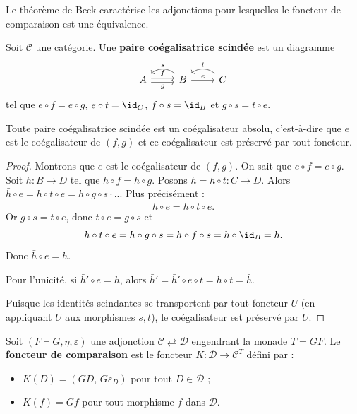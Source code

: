 Le théorème de Beck caractérise les adjonctions
pour lesquelles le foncteur de comparaison est une équivalence.

\begin{definition}\label{def:paire-coeg-scindee}
Soit $\mathcal{C}$ une catégorie.
Une \textbf{paire coégalisatrice scindée} est un diagramme
\[
\begin{tikzcd}
A \arrow[r, shift left=0.5ex, "f"] \arrow[r, shift right=0.5ex, "g"'] &
B \arrow[r, "e"] \arrow[l, bend right=40, "s"'] &
C \arrow[l, bend right=40, "t"']
\end{tikzcd}
\]
tel que $e \circ f = e \circ g$, $e \circ t = \id_C$,
$f \circ s = \id_B$ et $g \circ s = t \circ e$.
\end{definition}

\begin{lemme}\label{lem:coeg-scindee-absolue}
Toute paire coégalisatrice scindée est un coégalisateur absolu,
c'est-à-dire que $e$ est le coégalisateur de $(f, g)$ et ce coégalisateur
est préservé par tout foncteur.
\end{lemme}

\begin{proof}
Montrons que $e$ est le coégalisateur de $(f, g)$.
On sait que $e \circ f = e \circ g$.
Soit $h \colon B \to D$ tel que $h \circ f = h \circ g$.
Posons $\bar{h} = h \circ t \colon C \to D$. Alors
$\bar{h} \circ e = h \circ t \circ e = h \circ g \circ s \cdot$...
Plus précisément :
\[
    \bar{h} \circ e = h \circ t \circ e.
\]
Or $g \circ s = t \circ e$, donc $t \circ e = g \circ s$ et
\[
    h \circ t \circ e = h \circ g \circ s = h \circ f \circ s = h \circ \id_B = h.
\]
Donc $\bar{h} \circ e = h$.

Pour l'unicité, si $\bar{h}' \circ e = h$, alors
$\bar{h}' = \bar{h}' \circ e \circ t = h \circ t = \bar{h}$.

Puisque les identités scindantes se transportent par tout foncteur $U$
(en appliquant $U$ aux morphismes $s, t$),
le coégalisateur est préservé par $U$.
\end{proof}

\begin{definition}\label{def:foncteur-comparaison}
Soit $(F \dashv G, \eta, \varepsilon)$ une adjonction
$\mathcal{C} \rightleftarrows \mathcal{D}$ engendrant la monade $T = GF$.
Le \textbf{foncteur de comparaison} est le foncteur
$K \colon \mathcal{D} \to \mathcal{C}^T$ défini par :
\begin{itemize}
    \item $K(D) = (GD,\, G\varepsilon_D)$ pour tout $D \in \mathcal{D}$ ;
    \item $K(f) = Gf$ pour tout morphisme $f$ dans $\mathcal{D}$.
\end{itemize}
\end{definition}


